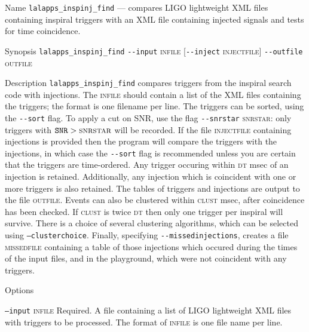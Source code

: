 \begin{entry}
\item[Name]
\verb$lalapps_inspinj_find$ --- compares LIGO lightweight XML files 
containing inspiral triggers with an XML file containing injected
signals and tests for time coincidence.


\item[Synopsis]
\verb$lalapps_inspinj_find$ 
\verb$--input$ \textsc{infile} [\verb$--inject$ \textsc{injectfile}]
\verb$--outfile$ \textsc{outfile}  
 


\item[Description] 
\verb$lalapps_inspinj_find$ compares triggers from the inspiral
search code with injections.  The \textsc{infile} should contain a
list of the XML files containing the triggers; the format is one
filename per line.  The triggers can be sorted, using the
\verb$--sort$ flag.  To apply a cut on SNR,  use the flag  
\verb$--snrstar$ \textsc{snrstar}:  only triggers with $\texttt{SNR} 
> \textsc{snrstar}$ will be recorded.  If the file \textsc{injectfile}
containing injections is provided then the program will compare the
triggers with the injections, in which case the \verb$--sort$ flag is
recommended unless you are certain that the triggers are time-ordered.
Any trigger occuring within \textsc{dt} msec of an injection
is retained.  Additionally, any injection which is coincident with one
or more triggers is also retained.  The tables of triggers and
injections are output to the file \textsc{outfile}.  Events can also
be clustered within \textsc{clust} msec, after coincidence has
been checked.  If \textsc{clust} is twice \textsc{dt}
then only one trigger per inspiral will survive.  There is a choice of
several clustering algorithms, which can be selected using
\texttt{--clusterchoice}.  Finally, specifying \verb$--missedinjections$,
creates a file \textsc{missedfile} containing a table of those
injections which occured during the times of the input files, and in
the playground, which were not coincident with any triggers.


\item[Options]\leavevmode
\begin{entry}
\item[\texttt{--input} \textsc{infile}] Required.  A file containing a
list of LIGO lightweight XML files with triggers to be processed.  The
format of \textsc{infile} is one file name per line.


\end{entry}
\end{entry}
